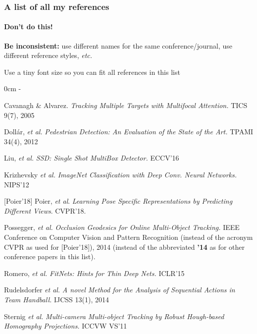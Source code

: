 \begin{frame}
  \frametitle{A list of all my references}
  \framesubtitle{\textcolor{clrsred}{\textbf{Don't do this!}}}
  \begin{lrsitemize}
    \setlength{\itemsep}{3pt}
    \item \textcolor{clrsred}{\textbf{Be inconsistent:}} use different names for the same conference/journal, use different reference styles, \emph{etc.}
    \item Use a tiny font size so you can fit all references in this list
  \end{lrsitemize}
  \begin{lrsitemize}
    \newlength\listindent
    \setlength\listindent{12pt}
     0cm \linewidth \listindent \dimexpr\linewidth-\listindent\relax
    \scriptsize
    \setlength{\itemsep}{3pt}
    \item[] [1] Cavanagh \& Alvarez. \emph{Tracking Multiple Targets with Multifocal Attention.} TICS 9(7), 2005
    \item[] [2] Doll\'ar, \emph{et al.} \emph{Pedestrian Detection: An Evaluation of the State of the Art.} TPAMI 34(4), 2012
    \item[] [3] Liu, \emph{et al.} \emph{SSD: Single Shot MultiBox Detector.} ECCV'16
    \item[] [4] Krizhevsky \emph{et al.} \emph{ImageNet Classification with Deep Conv. Neural Networks.} NIPS'12
    \item[] \textcolor{clrsred}{[Poier'18]} Poier, \emph{et al}. \emph{Learning Pose Specific Representations by Predicting Different Views}. CVPR'18.
    \item[] [5] Possegger, \emph{et al.} \emph{Occlusion Geodesics for Online Multi-Object Tracking.} IEEE Conference on Computer Vision and Pattern Recognition (\textcolor{clrsred}{instead of the acronym CVPR as used for [Poier'18]}), 2014 (\textcolor{clrsred}{instead of the abbreviated \textbf{'14} as for other conference papers in this list}).
    \item[] [6] Romero, \emph{et al.} \emph{FitNets: Hints for Thin Deep Nets.} ICLR'15
    \item[] [7] Rudelsdorfer \emph{et al.} \emph{A novel Method for the Analysis of Sequential Actions in Team Handball.} IJCSS 13(1), 2014
    \item[] [8] Sternig \emph{et al.} \emph{Multi-camera Multi-object Tracking by Robust Hough-based Homography Projections.} ICCVW VS'11
  \end{lrsitemize}
\end{frame}
